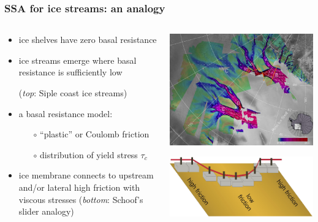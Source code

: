 \documentclass{beamer}
\begin{document}
\begin{frame}
  \frametitle{SSA for ice streams: an analogy}

\begin{columns}
\begin{column}{0.6\textwidth}
\begin{itemize}
\item ice shelves have zero basal resistance
\item ice streams emerge where basal resistance is sufficiently low

(\emph{top}: Siple coast ice streams)
\item a basal resistance model:
  \begin{itemize}
  \item[$\circ$] ``plastic'' or Coulomb friction 
  \item[$\circ$] distribution of yield stress $\tau_c$
  \end{itemize}
\item ice membrane connects to upstream and/or lateral high friction with viscous stresses (\emph{bottom}: Schoof's slider analogy)
\end{itemize}
\end{column}
\begin{column}{0.4\textwidth}
\includegraphics[width=\textwidth]{siple}

\vspace{0.3in}

\includegraphics[width=1.1\textwidth]{schoof-sliders}
\end{column}
\end{columns}
\end{frame}
\end{document}
